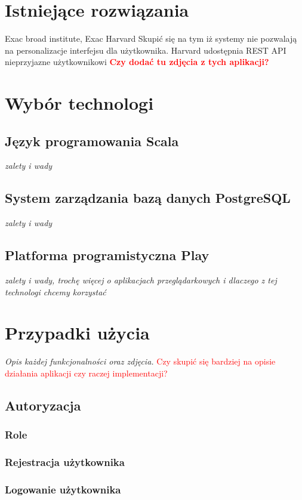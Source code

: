 \documentclass[a4paper,12pt,twoside]{article}
\begin{document}
\section{Istniejące rozwiązania}  

Exac broad institute, Exac Harvard  
Skupić się na tym iż systemy nie pozwalają na personalizacje interfejsu dla użytkownika.
Harvard udostępnia REST API nieprzyjazne użytkownikowi \newline
\textcolor{red}{\textbf{Czy dodać tu zdjęcia z tych aplikacji?}}

\newpage
\section{Wybór technologi}
\subsection{Język programowania Scala}
\textit{zalety i wady}
\subsection{System zarządzania bazą danych PostgreSQL}  
\textit{zalety i wady}
\subsection{Platforma programistyczna Play}
\textit{zalety i wady, trochę więcej o aplikacjach przeglądarkowych i dlaczego z tej technologi chcemy korzystać}

\newpage
\section{Przypadki użycia}

\textit{Opis każdej funkcjonalności oraz zdjęcia. }
\textcolor{red}{Czy skupić się bardziej na opisie działania aplikacji czy raczej implementacji?}

\subsection{Autoryzacja}
\subsubsection{Role}
\subsubsection{Rejestracja użytkownika}
\subsubsection{Logowanie użytkownika}
\end{document}
